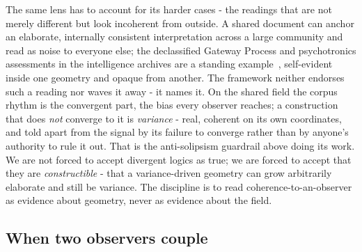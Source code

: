 The same lens has to account for its harder cases - the readings that are not merely different but look incoherent from outside. A shared document can anchor an elaborate, internally consistent interpretation across a large community and read as noise to everyone else; the declassified Gateway Process and psychotronics assessments in the intelligence archives are a standing example~\cite{gateway1983,psychotronicuniverse}, self-evident inside one geometry and opaque from another. The framework neither endorses such a reading nor waves it away - it names it. On the shared field the corpus rhythm is the convergent part, the bias every observer reaches; a construction that does \textit{not} converge to it is \textit{variance} - real, coherent on its own coordinates, and told apart from the signal by its failure to converge rather than by anyone's authority to rule it out. That is the anti-solipsism guardrail above doing its work. We are not forced to accept divergent logics as true; we are forced to accept that they are \textit{constructible} - that a variance-driven geometry can grow arbitrarily elaborate and still be variance. The discipline is to read coherence-to-an-observer as evidence about geometry, never as evidence about the field.

\subsection{When two observers couple}
\label{sec:coupling}

